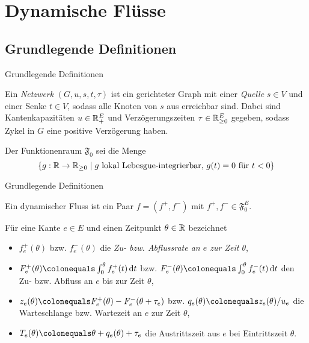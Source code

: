 \section{Dynamische Flüsse}
\subsection{Grundlegende Definitionen}

\begin{frame}{Grundlegende Definitionen}
	\begin{definition}[Netzwerk]
		Ein \emph{Netzwerk} $(G, u, s, t, \tau)$ ist ein gerichteter Graph mit einer \emph{Quelle} $s\in V$ und einer Senke $t\in V$, sodass alle Knoten von $s$ aus erreichbar sind.
		Dabei sind Kantenkapazitäten $u \in\mathbb{R}_+^E$ und Verzögerungszeiten $\tau\in\mathbb{R}_{\geq 0}^E$ gegeben, sodass Zykel in $G$ eine positive Verzögerung haben.
	\end{definition}
	
	\begin{definition}
		Der Funktionenraum $\mathfrak{F}_0$ sei die Menge
		\[ \{ g: \mathbb{R}\to\mathbb{R}_{\geq 0} \mid \text{$g$ lokal Lebesgue-integrierbar, $g(t) = 0$ für $t<0$} \} \]
	\end{definition}
\end{frame}


\begin{frame}{Grundlegende Definitionen}
	\begin{definition}
		Ein dynamischer Fluss ist ein Paar $f=(f^+, f^-)$ mit $f^+, f^-\in\mathfrak{F}_0^E$.
		
		Für eine Kante $e\in E$ und einen Zeitpunkt $\theta\in\mathbb{R}$ bezeichnet
		\begin{itemize}[label=$\color{darkblue}\bullet$]
			\item $f_e^+(\theta)$ bzw. $f_e^-(\theta)$ die \emph{Zu- bzw. Abflussrate an $e$ zur Zeit $\theta$},
			\item $F_e^+(\theta) \colonequals \int_0^\theta f^+_e(t) \diff t$ bzw. $F^-_e(\theta)\colonequals\int_0^\theta f^-_e(t)\diff t$ den Zu- bzw. Abfluss an $e$ bis zur Zeit $\theta$,
			\item $z_e(\theta)\colonequals F_e^+(\theta) - F_e^-(\theta + \tau_e)$ bzw. $q_e(\theta)\colonequals z_e(\theta)/u_e$ die Warteschlange bzw. Wartezeit an $e$ zur Zeit $\theta$,
			\item $T_e(\theta)\colonequals\theta + q_e(\theta) + \tau_e$ die Austrittszeit aus $e$ bei Eintrittszeit $\theta$.
		\end{itemize}	
	\end{definition}
\end{frame}



